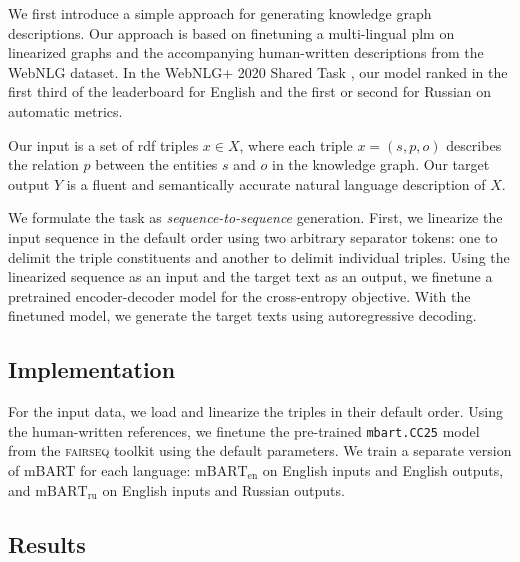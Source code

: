 \documentclass[12pt,notitlepage,a4paper,oneside,openany]{report}
\renewcommand\cite{\citep}
\begin{document}
We first introduce a simple approach for generating knowledge graph descriptions. Our approach is based on finetuning a multi-lingual \ac{plm} on linearized graphs and the accompanying human-written descriptions from the WebNLG dataset. In the WebNLG+ 2020 Shared Task \cite{ferreira20202020}, our model ranked in the first third of the leaderboard for English and the first or second for Russian on automatic metrics.

Our input is a set of \ac{rdf} triples $x \in X$, where each triple $x = (s, p, o)$ describes the relation $p$ between the entities $s$ and $o$ in the knowledge graph. Our target output $Y$ is a fluent and semantically accurate natural language description of $X$.

We formulate the task as \emph{sequence-to-sequence} generation. First, we linearize the input sequence in the default order using two arbitrary separator tokens: one to delimit the triple constituents and another to delimit individual triples. Using the linearized sequence as an input and the target text as an output, we finetune a pretrained encoder-decoder model for the cross-entropy objective. With the finetuned model, we generate the target texts using autoregressive decoding.

% 


\subsection{Implementation}
\label{sec:finetuning:implementation}
For the input data, we load and linearize the triples in their default order. Using the human-written references, we finetune the pre-trained \texttt{mbart.CC25} model from the \textsc{fairseq} toolkit \citep{ott2019fairseq} using the default parameters. We train a separate version of mBART for each language: $\text{mBART}_{\text{en}}$ on English inputs and English outputs, and $\text{mBART}_{\text{ru}}$ on English inputs and Russian outputs.



\subsection{Results}
\label{sec:finetuning:res}
\end{document}
